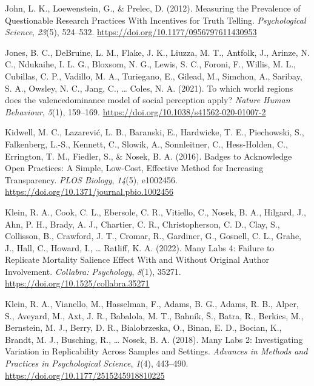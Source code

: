 \documentclass[
  man]{apa7}
\newlength{\cslhangindent}
\newlength{\cslentryspacingunit} %
\newenvironment{CSLReferences}[2] %
 {%
  \setlength{\parindent}{0pt}
  \ifodd #1
  \let\oldpar\par
  \def\par{\hangindent=\cslhangindent\oldpar}
  \fi
  \setlength{\parskip}{#2\cslentryspacingunit}
 }%
 {}
\begin{document}
\begin{CSLReferences}{1}{0}
\leavevmode{}%
John, L. K., Loewenstein, G., \& Prelec, D. (2012). Measuring the Prevalence of Questionable Research Practices With Incentives for Truth Telling. \emph{Psychological Science}, \emph{23}(5), 524--532. \url{https://doi.org/10.1177/0956797611430953}

\leavevmode{}%
Jones, B. C., DeBruine, L. M., Flake, J. K., Liuzza, M. T., Antfolk, J., Arinze, N. C., Ndukaihe, I. L. G., Bloxsom, N. G., Lewis, S. C., Foroni, F., Willis, M. L., Cubillas, C. P., Vadillo, M. A., Turiegano, E., Gilead, M., Simchon, A., Saribay, S. A., Owsley, N. C., Jang, C., \ldots{} Coles, N. A. (2021). To which world regions does the valence{\textendash}dominance model of social perception apply? \emph{Nature Human Behaviour}, \emph{5}(1), 159--169. \url{https://doi.org/10.1038/s41562-020-01007-2}

\leavevmode{}%
Kidwell, M. C., Lazarević, L. B., Baranski, E., Hardwicke, T. E., Piechowski, S., Falkenberg, L.-S., Kennett, C., Slowik, A., Sonnleitner, C., Hess-Holden, C., Errington, T. M., Fiedler, S., \& Nosek, B. A. (2016). Badges to Acknowledge Open Practices: A Simple, Low-Cost, Effective Method for Increasing Transparency. \emph{PLOS Biology}, \emph{14}(5), e1002456. \url{https://doi.org/10.1371/journal.pbio.1002456}

\leavevmode{}%
Klein, R. A., Cook, C. L., Ebersole, C. R., Vitiello, C., Nosek, B. A., Hilgard, J., Ahn, P. H., Brady, A. J., Chartier, C. R., Christopherson, C. D., Clay, S., Collisson, B., Crawford, J. T., Cromar, R., Gardiner, G., Gosnell, C. L., Grahe, J., Hall, C., Howard, I., \ldots{} Ratliff, K. A. (2022). Many Labs 4: Failure to Replicate Mortality Salience Effect With and Without Original Author Involvement. \emph{Collabra: Psychology}, \emph{8}(1), 35271. \url{https://doi.org/10.1525/collabra.35271}

\leavevmode{}%
Klein, R. A., Vianello, M., Hasselman, F., Adams, B. G., Adams, R. B., Alper, S., Aveyard, M., Axt, J. R., Babalola, M. T., Bahník, Š., Batra, R., Berkics, M., Bernstein, M. J., Berry, D. R., Bialobrzeska, O., Binan, E. D., Bocian, K., Brandt, M. J., Busching, R., \ldots{} Nosek, B. A. (2018). Many Labs 2: Investigating Variation in Replicability Across Samples and Settings. \emph{Advances in Methods and Practices in Psychological Science}, \emph{1}(4), 443--490. \url{https://doi.org/10.1177/2515245918810225}


\end{CSLReferences}
\end{document}
